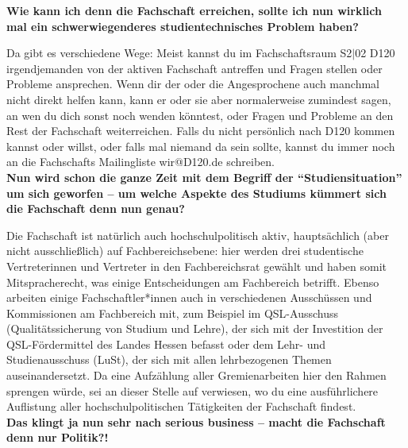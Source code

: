 {\textbf{Wie kann ich denn die Fachschaft erreichen, sollte ich nun wirklich mal ein schwerwiegenderes studientechnisches Problem haben?}

Da gibt es verschiedene Wege: Meist kannst du im Fachschaftsraum S2$|$02 D120 irgendjemanden von der aktiven Fachschaft antreffen und Fragen stellen oder Probleme ansprechen. Wenn dir der oder die Angesprochene auch manchmal nicht direkt helfen kann, kann er oder sie aber normalerweise zumindest sagen, an wen du dich sonst noch wenden könntest, oder Fragen und Probleme an den Rest der Fachschaft weiterreichen. Falls du nicht persönlich nach D120 kommen kannst oder willst, oder falls mal niemand da sein sollte, kannst du immer noch an die Fachschafts Mailingliste wir@D120.de schreiben.\\

\textbf{Nun wird schon die ganze Zeit mit dem Begriff der "`Studiensituation"' um sich geworfen – um welche Aspekte des Studiums kümmert sich die Fachschaft denn nun genau?}

Die Fachschaft ist natürlich auch hochschulpolitisch aktiv, hauptsächlich (aber nicht ausschließlich) auf Fachbereichsebene: hier werden drei studentische Vertreterinnen und Vertreter in den Fachbereichsrat gewählt und haben somit Mitspracherecht, was einige Entscheidungen am Fachbereich betrifft. Ebenso arbeiten einige Fachschaftler*innen auch in verschiedenen Ausschüssen und Kommissionen am Fachbereich mit, zum Beispiel im QSL-Ausschuss (Qualitätssicherung von Studium und Lehre), der sich mit der Investition der QSL-Fördermittel des Landes Hessen befasst oder dem Lehr- und Studienausschuss (LuSt), der sich mit allen lehrbezogenen Themen auseinandersetzt. Da eine Aufzählung aller Gremienarbeiten hier den Rahmen sprengen würde, sei an dieser Stelle auf \footnotemark[1] verwiesen, wo du eine ausführlichere Auflistung aller hochschulpolitischen Tätigkeiten der Fachschaft findest.\\

\textbf{Das klingt ja nun sehr nach serious business – macht die Fachschaft denn nur Politik?!}

}
